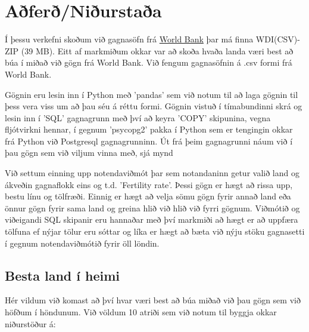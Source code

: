 \documentclass[11pt,a4paper]{amsart}
\theoremstyle{plain}
\theoremstyle{definition}
\theoremstyle{remark}
\begin{document}


\section{Aðferð/Niðurstaða}
Í þessu verkefni skoðum við gagnasöfn frá \href{http://data.worldbank.org/data-catalog/world-development-indicators}{World Bank} þar má finna WDI(CSV)-ZIP (39 MB). Eitt af markmiðum okkar var að skoða hvaða landa væri best að búa í miðað við gögn frá World Bank. Við fengum gagnasöfnin á .csv formi frá World Bank.\par Gögnin eru lesin inn í Python með 'pandas' sem við notum til að laga gögnin til þess vera viss um að þau séu á réttu formi. Gögnin vistuð í tímabundinni skrá og lesin inn í 'SQL' gagnagrunn með því að keyra 'COPY' skipunina, vegna fljótvirkni hennar, í gegnum 'psycopg2' pakka í Python sem er tengingin okkar frá Python við Postgresql gagnagrunninn. Út frá þeim gagnagrunni náum við í þau gögn sem við viljum vinna með, sjá mynd %
\par Við settum einning upp notendaviðmót þar sem notandaninn getur valið land og ákveðin gagnaflokk eins og t.d. 'Fertility rate'. Þessi gögn er hægt að rissa upp, bestu línu og tölfræði. Einnig er hægt að velja sömu gögn fyrir annað land eða önnur gögn fyrir sama land og greina hlið við hlið við fyrri gögnum. Viðmótið og viðeigandi SQL skipanir eru hannaðar með því markmiði að hægt er að uppfæra tölfuna ef nýjar tölur eru sóttar og líka er hægt að bæta við nýju stöku gagnasetti í gegnum notendaviðmótið fyrir öll löndin.


\subsection{Besta land í heimi}
Hér vildum við komast að því hvar væri best að búa miðað við þau gögn sem við höfðum í höndunum. Við völdum 10 atriði sem við notum til byggja okkar niðurstöður á:
\vspace{3mm}
\\
\end{document}
